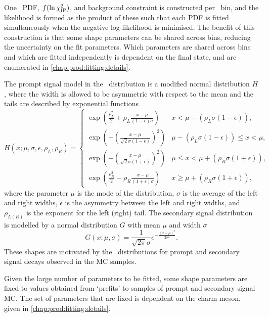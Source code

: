 One \lnipchisq\ \ac{PDF}, $f(\ln\chi^2_{\textnormal{IP}})$, and background constraint is 
constructed per \pTy\ bin, and the likelihood is formed as the product of these 
such that each \ac{PDF} is fitted simultaneously when the negative 
log-likelihood is minimised.
The benefit of this construction is that some shape parameters can be shared 
across bins, reducing the uncertainty on the fit parameters.
Which parameters are shared across bins and which are fitted independently is 
dependent on the final state, and are enumerated in 
\cref{chap:prod:fitting:details}.

The prompt signal model in the \lnipchisq\ distribution is a modified normal 
distribution $H$, where the width is allowed to be asymmetric with respect to 
the mean and the tails are described by exponential functions
\begin{equation}
  H(x; \mu, \sigma, \epsilon, \rho_{L}, \rho_{R}) =
  \begin{cases}
    \exp\left(\frac{\rho_{L}^{2}}{2} + \rho_{L}\frac{x - \mu}{(1 - 
    \epsilon)\sigma}\right) & x < \mu - (\rho_{L}\sigma(1 - 
        \epsilon)), \\
    \exp\left(-\left(\frac{x - \mu}{\sqrt{2}\sigma(1 - 
    \epsilon)}\right)^{2}\right) & \mu - (\rho_{L}\sigma(1 - \epsilon)) 
          \leq x < \mu, \\
    \exp\left(-\left(\frac{x - \mu}{\sqrt{2}\sigma(1 + 
    \epsilon)}\right)^{2}\right) & \mu \leq x < \mu + (\rho_{R}\sigma(1 + 
          \epsilon)), \\
    \exp\left(\frac{\rho_{R}^{2}}{2} - \rho_{R}\frac{x - \mu}{(1 + 
    \epsilon)\sigma}\right) & x \geq \mu + (\rho_{R}\sigma(1 + 
        \epsilon)),
  \end{cases}
\end{equation}
where the parameter $\mu$ is the mode of the distribution, $\sigma$ is the 
average of the left and right widths, $\epsilon$ is the asymmetry between the 
left and right widths, and $\rho_{L(R)}$ is the exponent for the left (right) 
tail.
The secondary signal distribution is modelled by a normal distribution $G$ with 
mean $\mu$ and width $\sigma$
\begin{equation}
  G(x; \mu, \sigma) = \frac{1}{\sqrt{2\pi}\sigma}
                      e^{-\frac{{(x - \mu)}^{2}}{2\sigma^{2}}}.
\end{equation}
These shapes are motivated by the \lnipchisq\ distributions for prompt and 
secondary signal decays observed in the \ac{MC} samples.

Given the large number of parameters to be fitted, some shape parameters are 
fixed to values obtained from `prefits' to samples of prompt and secondary 
signal \ac{MC}.
The set of parameters that are fixed is dependent on the charm meson, given in 
\cref{chap:prod:fitting:details}.

